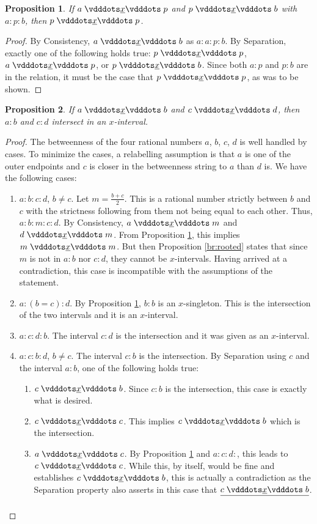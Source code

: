 \documentclass[12pt]{article}
\newtheorem{proposition}{Proposition}[section]
\begin{document}
\begin{proposition}\label{br:endpointed}
    If $a \xrel p$ and $p \xrel b$ with $a:p:b$, then $p \xrel p$.
\end{proposition}

\begin{proof}
    By Consistency, $a \xrel b$ as $a:a:p:b$.  By Separation, exactly one of the following holds true: $p \xrel p$,  \sout{$a \xrel p$}, or \sout{$p \xrel b$}. Since both $a:p$ and $p:b$ are in the relation, it must be the case that $p \xrel p$, as was to be shown. 
\end{proof}


\begin{proposition}\label{br:intersect}
    If $a \xrel b$ and $c \xrel d$, then $a:b$ and $c:d$ intersect in an $x$-interval. 
\end{proposition}

\begin{proof}
    The betweenness of the four rational numbers $a$, $b$, $c$, $d$ is well handled by cases. To minimize the cases, a relabelling assumption is that $a$ is one of the outer endpoints and $c$ is closer in the betweenness string to $a$ than $d$ is. We have the following cases: 

    \begin{enumerate}
        \item $a:b:c:d$, $b \neq c$. Let $m = \frac{b+c}{2}$. This is a rational number strictly between $b$ and $c$ with the strictness following from them not being equal to each other. Thus, $a:b:m:c:d$. By Consistency, $a\xrel m$ and $d \xrel m$. From Proposition \ref{br:endpointed}, this implies $m \xrel m$. But then Proposition \ref{br:rooted} states that since $m$ is not in $a:b$ nor $c:d$, they cannot be $x$-intervals. Having arrived at a contradiction, this case is incompatible with the assumptions of the statement. 
        \item $a:(b=c):d$. By Proposition \ref{br:endpointed}, $b:b$ is an $x$-singleton. This is the intersection of the two intervals and it is an $x$-interval. 
        \item $a:c:d:b$. The interval $c:d$ is the intersection and it was given as an $x$-interval. 
        \item $a:c:b:d$, $b \neq c$. The interval $c:b$ is the intersection. By Separation using $c$ and the interval $a:b$, one of the following holds true: 
        \begin{enumerate}
            \item $c \xrel b$. Since $c:b$ is the intersection, this case is exactly what is desired.
            \item $c \xrel c$. This implies $c \xrel b$ which is the intersection. 
            \item $a \xrel c$. By Proposition \ref{br:endpointed} and $a : c: d:$, this leads to $c \xrel c$. While this, by itself, would be fine and establishes $c \xrel b$, this is actually a contradiction as the Separation property also asserts in this case that $\sout{c \xrel b}$.
        \end{enumerate}
    \end{enumerate}
\end{proof}
\end{document}

